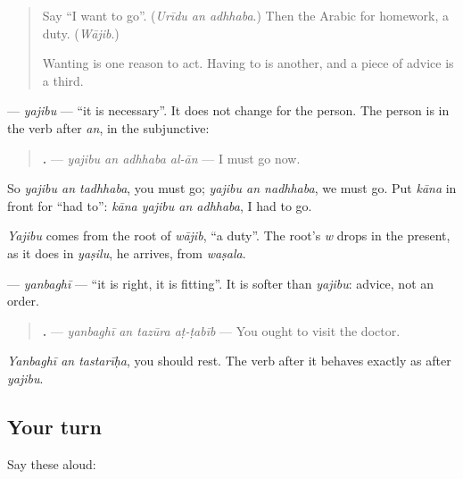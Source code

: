 \begin{quote}
Say \textquotedblleft{}I want to go\textquotedblright{}. (\emph{Urīdu an adhhaba}.) Then the Arabic for homework, a duty. (\emph{Wājib}.)

Wanting is one reason to act. Having to is another, and a piece of advice is a third.
\end{quote}

\begin{grammarlens}[title={Grammar Lens: yajibu an, it is necessary}]
\textbf{} — \emph{yajibu} — \textquotedblleft{}it is necessary\textquotedblright{}. It does not change for the person. The person is in the verb after \emph{an}, in the subjunctive:

\begin{quote}
\textbf{   .} — \emph{yajibu an adhhaba al-ān} — I must go now.
\end{quote}

So \emph{yajibu an tadhhaba}, you must go; \emph{yajibu an nadhhaba}, we must go. Put \emph{kāna} in front for \textquotedblleft{}had to\textquotedblright{}: \emph{kāna yajibu an adhhaba}, I had to go.

\emph{Yajibu} comes from the root of \emph{wājib}, \textquotedblleft{}a duty\textquotedblright{}. The root's \emph{w} drops in the present, as it does in \emph{yaṣilu}, he arrives, from \emph{waṣala}.
\end{grammarlens}

\begin{grammarlens}[title={Grammar Lens: yanbaghī an, you ought to}]
\textbf{} — \emph{yanbaghī} — \textquotedblleft{}it is right, it is fitting\textquotedblright{}. It is softer than \emph{yajibu}: advice, not an order.

\begin{quote}
\textbf{   .} — \emph{yanbaghī an tazūra aṭ-ṭabīb} — You ought to visit the doctor.
\end{quote}

\emph{Yanbaghī an tastarīḥa}, you should rest. The verb after it behaves exactly as after \emph{yajibu}.
\end{grammarlens}

\subsection*{Your turn}
Say these aloud:


